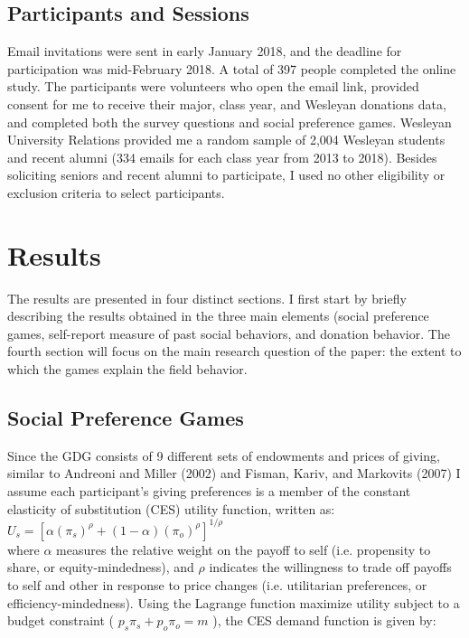 \documentclass{article}
\begin{document}
\subsection{Participants and Sessions}
Email invitations were sent in early January 2018, and the deadline for participation was mid-February 2018. A total of 397 people completed the online study. The participants were volunteers who open the email link, provided consent for me to receive their major, class year, and Wesleyan donations data, and completed both the survey questions and social preference games. Wesleyan University Relations provided me a random sample of 2,004 Wesleyan students and recent alumni (334 emails for each class year from 2013 to 2018). Besides soliciting seniors and recent alumni to participate, I used no other eligibility or exclusion criteria to select participants.


\section{Results}
The results are presented in four distinct sections. I first start by briefly describing the results obtained in the three main elements (social preference games, self-report measure of past social behaviors, and donation behavior. The fourth section will focus on the main research question of the paper: the extent to which the games explain the field behavior.

\subsection{Social Preference Games}
Since the GDG consists of 9 different sets of endowments and prices of giving, similar to Andreoni and Miller (2002) and Fisman, Kariv, and Markovits (2007) I assume each participant's giving preferences is a member of the constant elasticity of substitution (CES) utility function, written as: \\

\(U_{s} = [\alpha(\pi_{s})^{\rho} + (1-\alpha)(\pi_{o})^{\rho}]^{1/\rho} \) \\

\noindent
where \(\alpha\) measures the relative weight on the payoff to self (i.e. propensity to share, or equity-mindedness), and \(\rho\) indicates the willingness to trade off payoffs to self and other in response to price changes (i.e. utilitarian preferences, or efficiency-mindedness). Using the Lagrange function maximize utility subject to a budget constraint ( \(p_{s}\pi_{s} + p_{o}\pi_{o}=m\) ), the CES demand function is given by: \\
 
\end{document}
